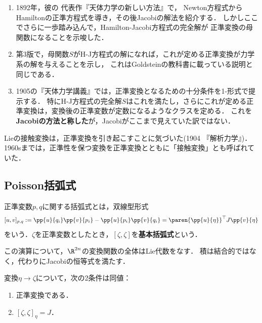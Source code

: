 \documentclass[uplatex,dvipdfmx]{jsreport}
\begin{document}
\begin{history}[Poincareの正準変換の研究]\mbox{}
    \begin{enumerate}
        \item 1892年，彼の
        代表作『天体力学の新しい方法』\cite{Poincare1892}で，
        Newton方程式からHamiltonの正準方程式を導き，その後Jacobiの解法を紹介する．
        しかしここでさらに一歩踏み込んで，Hamilton-Jacobi方程式の完全解が
        正準変換の母関数になることを示唆した．
        \item 第3版で，母関数$S$がH-J方程式の解になれば，これが定める正準変換が力学系の解を与えることを示し，
        これはGoldsteinの教科書に載っている説明と同じである．
        \item 1905の『天体力学講義』\cite{Poincare1905}では，正準変換となるための十分条件を1-形式で提示する．
        特にH-J方程式の完全解$S$はこれを満たし，さらにこれが定める正準変換は，変換後の正準変数が定数になるようなクラスを定める．
        これを\textbf{Jacobiの方法と称した}が，Jacobiがここまで見えていた訳ではない．
    \end{enumerate}
\end{history}

\begin{history}
    Lieの接触変換は，正準変換を引き起こすことに気づいた(1904 『解析力学』)．
    1960sまでは，正準性を保つ変換を正準変換とともに「接触変換」とも呼ばれていた．
\end{history}

\subsection{Poisson括弧式}

\begin{definition}
    正準変数$p,q$に関する括弧式とは，双線型形式
    \[[u,v]_{p,q}:=\pp{u}{q_i}\pp{v}{p_i}-\pp{u}{p_i}\pp{v}{q_i}=\paren{\pp{u}{\eta}}^\top J\pp{v}{\eta}\]
    をいう．$\zeta$を正準変数としたとき，$[\zeta,\zeta]$を\textbf{基本括弧式}という．
\end{definition}

\begin{lemma}
    この演算について，$\R^{2n}$の変換関数の全体はLie代数をなす．
    積は結合的ではなく，代わりにJacobiの恒等式を満たす．
\end{lemma}

\begin{proposition}
    変換$\eta\to\zeta$について，次の2条件は同値：
    \begin{enumerate}
        \item 正準変換である．
        \item $[\zeta,\zeta]_\eta=J$．
    \end{enumerate}
\end{proposition}
\end{document}
